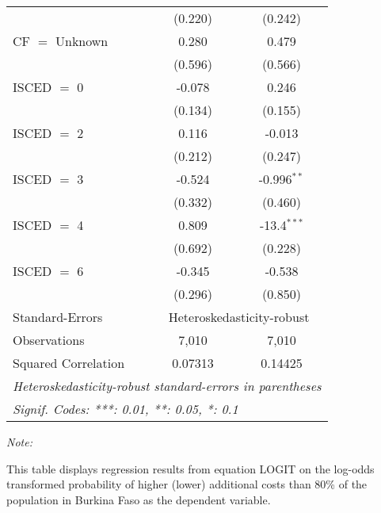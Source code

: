 \begin{table}[htbp!]
\begin{adjustbox}{width = 1\textwidth, max height = 0.95\textheight, center}
\begin{threeparttable}[b]
\begin{tabular}{lcc}
                                 & (0.220)       & (0.242)\\   
            CF $=$ Unknown       & 0.280         & 0.479\\   
                                 & (0.596)       & (0.566)\\   
            ISCED $=$ 0          & -0.078        & 0.246\\   
                                 & (0.134)       & (0.155)\\   
            ISCED $=$ 2          & 0.116         & -0.013\\   
                                 & (0.212)       & (0.247)\\   
            ISCED $=$ 3          & -0.524        & -0.996$^{**}$\\   
                                 & (0.332)       & (0.460)\\   
            ISCED $=$ 4          & 0.809         & -13.4$^{***}$\\   
                                 & (0.692)       & (0.228)\\   
            ISCED $=$ 6          & -0.345        & -0.538\\   
                                 & (0.296)       & (0.850)\\   
            \midrule 
            Standard-Errors & \multicolumn{2}{c}{Heteroskedasticity-robust} \\ 
            Observations         & 7,010         & 7,010\\  
            Squared Correlation  & 0.07313       & 0.14425\\  
            \midrule \midrule
            \multicolumn{3}{l}{\emph{Heteroskedasticity-robust standard-errors in parentheses}}\\
            \multicolumn{3}{l}{\emph{Signif. Codes: ***: 0.01, **: 0.05, *: 0.1}}\\
         \end{tabular}
         
         \begin{tablenotes}\item \medskip \textit{Note:}
            \item This table displays regression results from equation LOGIT on the log-odds transformed probability of higher (lower) additional costs than 80\% of the population in Burkina Faso as the dependent variable. 
         \end{tablenotes}
      \end{threeparttable}
   \end{adjustbox}
\end{table}


